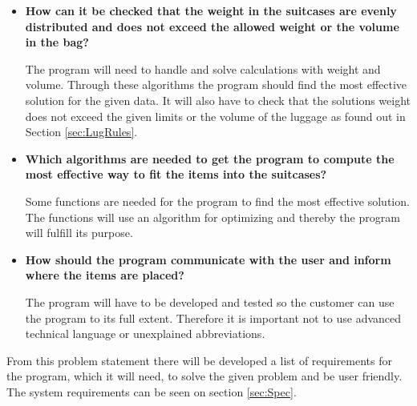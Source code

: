 \begin{itemize}
\item \textbf{How can it be checked that the weight in the suitcases are evenly distributed and does not exceed the allowed weight or the volume in the bag?}

The program will need to handle and solve calculations with weight and volume. Through these algorithms the program should find the most effective solution for the given data. It will also have to check that the solutions weight does not exceed the given limits or the volume of the luggage as found out in Section \ref{sec:LugRules}.

\item \textbf{Which algorithms are needed to get the program to compute the most effective way to fit the items into the suitcases?}

Some functions are needed for the program to find the most effective solution. The functions will use an algorithm for optimizing and thereby the program will fulfill its purpose.

\item \textbf{How should the program communicate with the user and inform where the items are placed?}

The program will have to be developed and tested so the customer can use the program to its full extent. Therefore it is important not to use advanced technical language or unexplained abbreviations.
\end{itemize}

From this problem statement there will be developed a list of requirements for the program, which it will need, to solve the given problem and be user friendly. The system requirements can be seen on section \ref{sec:Spec}.
